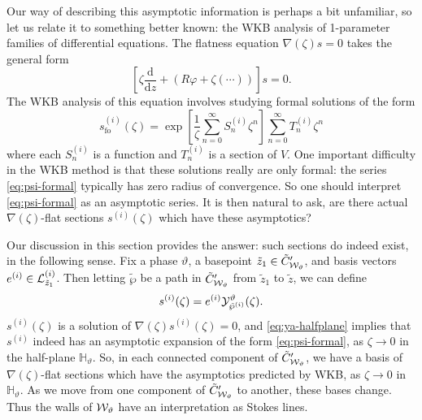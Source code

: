 \documentclass[11pt,a4paper]{article}
\def\CL {{\cal L}}
\def\wnet {{\cal W}}
\def\cY {{\cal Y}}
\def\tz{{\tilde z}}
\def\CL {{\cal L}}
\def\wnet {{\cal W}}
\newcommand\de{{\mathrm{d}}}
\newcommand\formal{{\mathrm{fo}}}
\begin{document}
Our way of describing this asymptotic information is perhaps a bit unfamiliar, so let us relate it to
something better known:  the WKB analysis of 1-parameter families of differential equations.
The flatness equation $\nabla(\zeta)s=0$ takes the general form
\begin{equation}
\left[ \zeta \frac{\de}{\de z} + (R \varphi + \zeta(\cdots)) \right] s = 0.
\end{equation}
The WKB analysis of this equation involves studying formal solutions of the form
\begin{equation} \label{eq:psi-formal}
s^{(i)}_\formal(\zeta) = \exp\left[ \frac{1}{\zeta} \sum_{n=0}^\infty S_n^{(i)} \zeta^n \right] \sum_{n=0}^\infty T^{(i)}_n \zeta^n
\end{equation}
where each $S^{(i)}_n$ is a function and $T^{(i)}_n$ is a section of $V$.
One important difficulty in the WKB method is that these solutions really are only formal:  the series \eqref{eq:psi-formal}
typically has zero radius of convergence.  So one should interpret \eqref{eq:psi-formal} as an asymptotic series.
It is then natural to ask,
are there actual $\nabla(\zeta)$-flat sections $s^{(i)}(\zeta)$ which have these asymptotics?

Our discussion in this section provides the answer:  such sections do indeed exist, in the
following sense.
Fix a phase $\vartheta$, a basepoint $\tz_1 \in \tilde C'_{\wnet_\vartheta}$,
and basis vectors $e^{(i)} \in \CL_{\tz_1}^{(i)}$.  Then
letting $\tilde\wp$ be a path in $\tilde C'_{\wnet_\vartheta}$ from $\tz_1$ to $\tz$, we can define
\begin{equation}
s^{(i)}(\zeta) = e^{(i)} \cY^\vartheta_{\tilde\wp^{(i)}}(\zeta).
\end{equation}
$s^{(i)}(\zeta)$ is a solution of $\nabla(\zeta) s^{(i)}(\zeta) = 0$, and
\eqref{eq:ya-halfplane} implies that $s^{(i)}$ indeed has an asymptotic expansion of the form \eqref{eq:psi-formal},
as $\zeta \to 0$ in the half-plane ${\mathbb H}_\vartheta$.
So, in each connected component of $\tilde C'_{\wnet_\vartheta}$, we have a basis of
$\nabla(\zeta)$-flat sections which have the asymptotics predicted by WKB,
as $\zeta \to 0$ in ${\mathbb H}_\vartheta$.  As we move from one component of $\tilde C'_{\wnet_\vartheta}$ to another,
these bases change.  Thus the walls of $\wnet_\vartheta$ have an interpretation as
Stokes lines.
\end{document}
